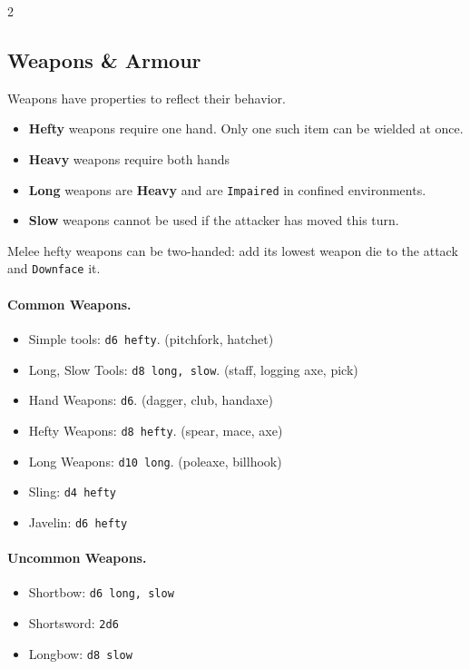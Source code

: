 

\label{sec:gear}

\begin{multicols*}{2}

\subsection*{Weapons \& Armour}

Weapons have properties to reflect their behavior.

\begin{itemize}[nosep, leftmargin=*]
    \item \textbf{Hefty} weapons require one hand. Only one such item can be wielded at once. 
    \item \textbf{Heavy} weapons require both hands
    \item \textbf{Long} weapons are \textbf{Heavy} and are \texttt{Impaired} in confined environments.
    \item \textbf{Slow} weapons cannot be used if the attacker has moved this turn.
\end{itemize}
Melee hefty weapons can be two-handed: add its lowest weapon die to the attack and \texttt{Downface} it.

\paragraph{Common Weapons.}
\begin{itemize}[nosep, leftmargin=*]
    \item [$\bullet$] Simple tools: \texttt{d6 hefty}. (pitchfork, hatchet)
    \item [$\bullet$] Long, Slow Tools: \texttt{d8 long, slow}. (staff, logging axe, pick)
    \item [$\bullet$] Hand Weapons: \texttt{d6}. (dagger, club, handaxe)
    \item [$\bullet$] Hefty Weapons: \texttt{d8 hefty}. (spear, mace, axe)
    \item [$\bullet$] Long Weapons: \texttt{d10 long}. (poleaxe, billhook)
    \item [$\bullet$] Sling: \texttt{d4 hefty}
    \item [$\bullet$] Javelin: \texttt{d6 hefty}
\end{itemize}
\paragraph{Uncommon Weapons.}
\begin{itemize}[nosep, leftmargin=*]
    \item [$\bullet$] Shortbow: \texttt{d6 long, slow}
    \item [$\bullet$] Shortsword: \texttt{2d6}
    \item [$\bullet$] Longbow: \texttt{d8 slow}
\end{itemize}

\end{multicols*}
